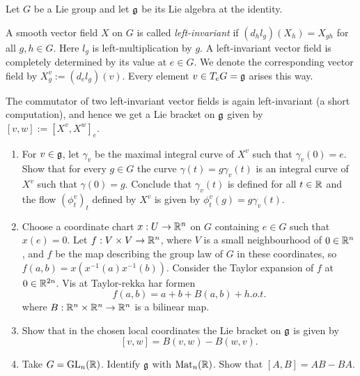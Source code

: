 \documentclass[11pt, english]{article}
\begin{document}
\begin{exc}
Let $G$ be a Lie group and let $\mathfrak g$ be its Lie algebra at the identity.

A smooth vector field $X$ on $G$ is called \emph{left-invariant} if $(d_hl_g)(X_h)=X_{gh}$ for all $g,h \in G$. Here $l_g$ is left-multiplication by $g$. A left-invariant vector field is completely determined by its value at $e \in G$. We denote the corresponding vector field by $X^v_g := (d_el_g)(v)$. Every element $v \in T_e G=\mathfrak g$ arises this way. 

The commutator of two left-invariant vector fields is again left-invariant (a short computation), and hence we get a Lie bracket on $\mathfrak g$ given by $[v,w] := [X^v, X^w]_e$. 

\begin{enumerate}
\item For $v \in \mathfrak g$, let $\gamma_v$ be the maximal integral curve of $X^v$ such that $\gamma_v(0)=e$. Show that for every $g \in G$ the curve $\gamma(t)=g \gamma_v(t)$ is an integral curve of $X^v$ such that $\gamma(0)=g$. Conclude that $\gamma_v(t)$ is defined for all $t \in \mathbb{R}$ and the flow $(\phi_t^v)_t$ defined by $X^v$ is given by $\phi_t^v(g)=g\gamma_v(t)$. 

\item Choose a coordinate chart $x:U \to \mathbb{R}^n$ on $G$ containing $e \in G$ such that $x(e)=0$. Let $f:V \times V \to \mathbb{R}^n$, where $V$ is a small neighbourhood of $0 \in \mathbb{R}^n$, and $f$ be the map describing the group law of $G$ in these coordinates, so $f(a,b)=x(x^{-1}(a)x^{-1}(b))$. Consider the Taylor expansion of $f$ at $0 \in \mathbb{R}^{2n}$. Vis at Taylor-rekka har formen
$$
f(a,b) = a+b+B(a,b)+h.o.t.
$$
where $B:\mathbb{R}^n \times \mathbb{R}^n \to \mathbb{R}^n$ is a bilinear map.

\item Show that in the chosen local coordinates the Lie bracket on $\mathfrak g$ is given by
\[
[v,w] = B(v,w) - B(w,v).
\]
\item Take $G=\operatorname{GL}_n(\mathbb{R})$. Identify $\mathfrak g$ with $\mathrm{Mat}_n(\mathbb{R})$. Show that $[A,B] = AB-BA$.
\end{enumerate}
\end{exc}
\end{document}
